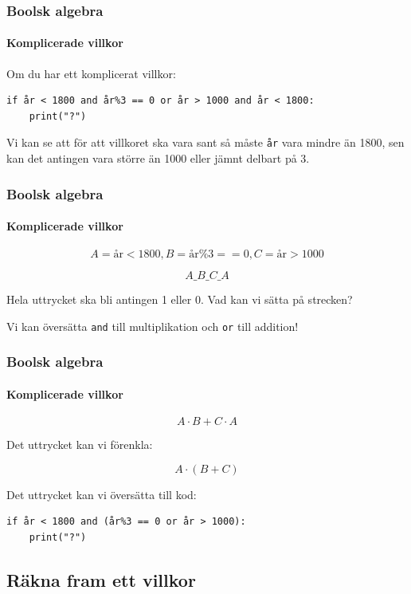 \documentclass{beamer}
\begin{document}
\begin{frame}[fragile]
	\frametitle{Boolsk algebra}
	\framesubtitle{Komplicerade villkor}
	
	Om du har ett komplicerat villkor:
	
	\begin{lstlisting}
if år < 1800 and år%3 == 0 or år > 1000 and år < 1800:
    print("?") 
	\end{lstlisting}
	
	Vi kan se att för att villkoret ska vara sant så måste \texttt{år} vara mindre än 1800, sen kan det antingen vara större än 1000 eller jämnt delbart på 3.
	
	
	
\end{frame}

\begin{frame}
	\frametitle{Boolsk algebra}
	\framesubtitle{Komplicerade villkor}
	
	\[
	A = \text{år}<1800, B = \text{år}\% 3 == 0, C = \text{år} > 1000
	\]
	
	\[
	A \_ B \_ C \_  A
	\]
	
	Hela uttrycket ska bli antingen 1 eller 0. Vad kan vi sätta på strecken?
	
	\pause
	
	Vi kan översätta \texttt{and} till multiplikation och \texttt{or} till addition!
	
\end{frame}
	
\begin{frame}[fragile]
	\frametitle{Boolsk algebra}
	\framesubtitle{Komplicerade villkor}
	
	\[
	A \cdot B + C \cdot A  
	\]
	
	Det uttrycket kan vi förenkla:
	
	\[
	A \cdot \left( B+C\right)
	\]
	
	Det uttrycket kan vi översätta till kod:
	
	\begin{lstlisting}
if år < 1800 and (år%3 == 0 or år > 1000):
    print("?")
	\end{lstlisting}

\end{frame}

\subsection{Räkna fram ett villkor}
\end{document}
